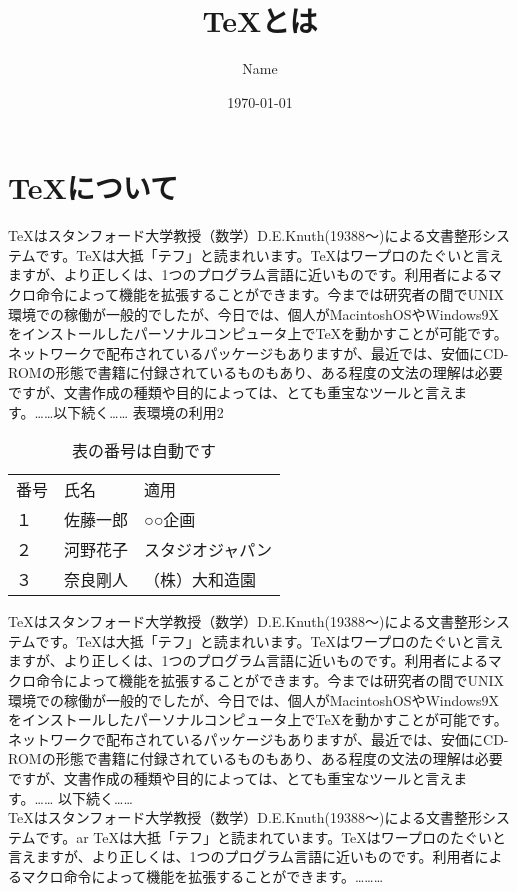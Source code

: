 \documentclass[twocolumn,10pt]{jarticle}
\title{\TeX とは}
\author{Name}
\date{\today}
\begin{document}
\maketitle
\section{\TeX について}
TeXはスタンフォード大学教授（数学）D.E.Knuth(19388～)による文書整形システムです。TeXは大抵「テフ」と読まれいます。TeXはワープロのたぐいと言えますが、より正しくは、1つのプログラム言語に近いものです。利用者によるマクロ命令によって機能を拡張することができます。今までは研究者の間でUNIX環境での稼働が一般的でしたが、今日では、個人がMacintoshOSやWindows9Xをインストールしたパーソナルコンピュータ上でTeXを動かすことが可能です。ネットワークで配布されているパッケージもありますが、最近では、安価にCD-ROMの形態で書籍に付録されているものもあり、ある程度の文法の理解は必要ですが、文書作成の種類や目的によっては、とても重宝なツールと言えます。……以下続く……
表環境の利用2
\begin{table}[h]
\begin{center}
\caption{表の番号は自動です}
\label{tbl:a1}
\begin{tabular}{|l|l|l|}
\hline
番号 & 氏名 & 適用 \\
\cline{1-3}
１ & 佐藤一郎 & ○○企画 \\
\hline
２ & 河野花子 & スタジオジャパン \\
\hline
３ & 奈良剛人 & （株）大和造園 \\
\hline
\end{tabular}
\end{center}
\end{table}
\twocolumn
TeXはスタンフォード大学教授（数学）D.E.Knuth(19388～)による文書整形システムです。TeXは大抵「テフ」と読まれいます。TeXはワープロのたぐいと言えますが、より正しくは、1つのプログラム言語に近いものです。利用者によるマクロ命令によって機能を拡張することができます。今までは研究者の間でUNIX環境での稼働が一般的でしたが、今日では、個人がMacintoshOSやWindows9Xをインストールしたパーソナルコンピュータ上でTeXを動かすことが可能です。ネットワークで配布されているパッケージもありますが、最近では、安価にCD-ROMの形態で書籍に付録されているものもあり、ある程度の文法の理解は必要ですが、文書作成の種類や目的によっては、とても重宝なツールと言えます。……
\onecolumn
以下続く……\\
TeXはスタンフォード大学教授（数学）D.E.Knuth(19388～)による文書整形システムです。ar TeXは大抵「テフ」と読まれています。TeXはワープロのたぐいと言えますが、より正しくは、1つのプログラム言語に近いものです。利用者によるマクロ命令によって機能を拡張することができます。………
\end{document}

